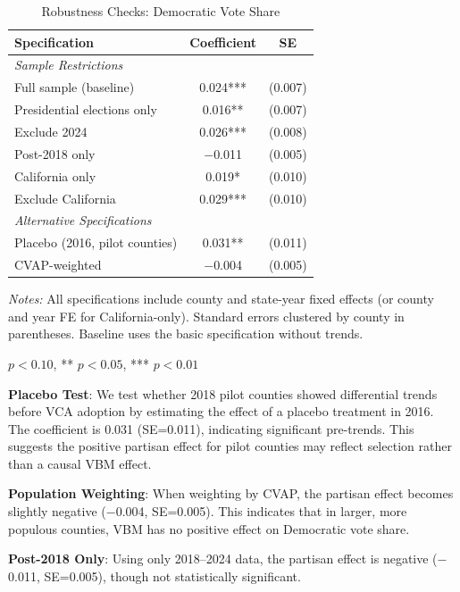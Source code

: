 \documentclass[12pt]{article}
\begin{document}
\begin{table}[H]
\centering
\caption{Robustness Checks: Democratic Vote Share}
\label{tab:robustness}
\begin{threeparttable}
\begin{tabular}{lcc}
\toprule
Specification & Coefficient & SE \\
\midrule
\multicolumn{3}{l}{\textit{Sample Restrictions}} \\
Full sample (baseline) & 0.024*** & (0.007) \\
Presidential elections only & 0.016** & (0.007) \\
Exclude 2024 & 0.026*** & (0.008) \\
Post-2018 only & $-$0.011 & (0.005) \\
California only & 0.019* & (0.010) \\
Exclude California & 0.029*** & (0.010) \\[0.5em]
\multicolumn{3}{l}{\textit{Alternative Specifications}} \\
Placebo (2016, pilot counties) & 0.031** & (0.011) \\
CVAP-weighted & $-$0.004 & (0.005) \\
\bottomrule
\end{tabular}
\begin{tablenotes}
\small
\item \textit{Notes:} All specifications include county and state-year fixed effects (or county and year FE for California-only). Standard errors clustered by county in parentheses. Baseline uses the basic specification without trends.
\item * $p<0.10$, ** $p<0.05$, *** $p<0.01$
\end{tablenotes}
\end{threeparttable}
\end{table}

\textbf{Placebo Test}: We test whether 2018 pilot counties showed differential trends before VCA adoption by estimating the effect of a placebo treatment in 2016. The coefficient is 0.031 (SE=0.011), indicating significant pre-trends. This suggests the positive partisan effect for pilot counties may reflect selection rather than a causal VBM effect.

\textbf{Population Weighting}: When weighting by CVAP, the partisan effect becomes slightly negative ($-$0.004, SE=0.005). This indicates that in larger, more populous counties, VBM has no positive effect on Democratic vote share.

\textbf{Post-2018 Only}: Using only 2018--2024 data, the partisan effect is negative ($-$0.011, SE=0.005), though not statistically significant.
\end{document}
